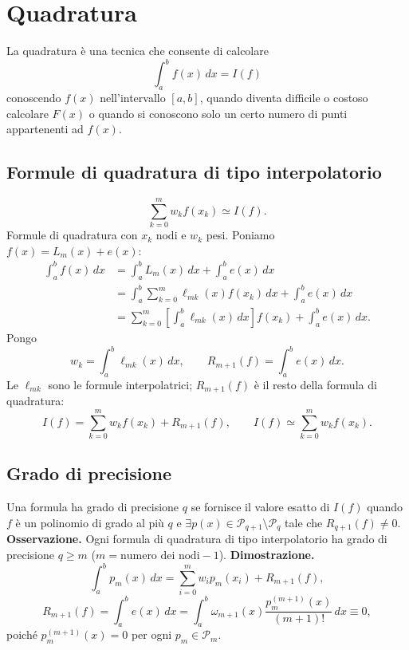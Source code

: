 \section*{Quadratura}
La quadratura è una tecnica che consente di calcolare
\[\int_a^b f(x)\,dx=I(f)\]
conoscendo $f(x)$ nell'intervallo $[a,b]$, quando diventa difficile o costoso calcolare $F(x)$ o quando si conoscono solo un certo numero di punti appartenenti ad $f(x)$.
\subsection*{Formule di quadratura di tipo interpolatorio}
\[\sum_{k=0}^m w_k f(x_k)\simeq I(f).\]
Formule di quadratura con $x_k$ nodi e $w_k$ pesi. Poniamo $f(x)=L_m(x)+e(x)$:
\begin{align*}
\int_a^b f(x)\,dx&=\int_a^b L_m(x)\,dx+\int_a^b e(x)\,dx\\
&=\int_a^b\sum_{k=0}^m\ell_{mk}(x)f(x_k)\,dx+\int_a^b e(x)\,dx\\
&=\sum_{k=0}^m\left[\int_a^b\ell_{mk}(x)\,dx\right]f(x_k)+\int_a^b e(x)\,dx.
\end{align*}
Pongo
\[w_k=\int_a^b\ell_{mk}(x)\,dx,\qquad R_{m+1}(f)=\int_a^b e(x)\,dx.\]
Le $\ell_{mk}$ sono le formule interpolatrici; $R_{m+1}(f)$ è il resto della formula di quadratura:
\[\boxed{I(f)=\sum_{k=0}^m w_k f(x_k)+R_{m+1}(f)},\qquad I(f)\simeq\sum_{k=0}^m w_k f(x_k).\]
\subsection*{Grado di precisione}
Una formula ha grado di precisione $q$ se fornisce il valore esatto di $I(f)$ quando $f$ è un polinomio di grado al più $q$ e $\exists p(x)\in\mathcal P_{q+1}\setminus\mathcal P_q$ tale che $R_{q+1}(f)\ne0$.
\textbf{Osservazione.} Ogni formula di quadratura di tipo interpolatorio ha grado di precisione $q\ge m$ ($m=\text{numero dei nodi}-1$).
\textbf{Dimostrazione.}
\[\int_a^b p_m(x)\,dx=\sum_{i=0}^m w_i p_m(x_i)+R_{m+1}(f),\]
\[R_{m+1}(f)=\int_a^b e(x)\,dx=\int_a^b\omega_{m+1}(x)\frac{p_m^{(m+1)}(x)}{(m+1)!}\,dx\equiv0,\]
poiché $p_m^{(m+1)}(x)=0$ per ogni $p_m\in\mathcal P_m$.
